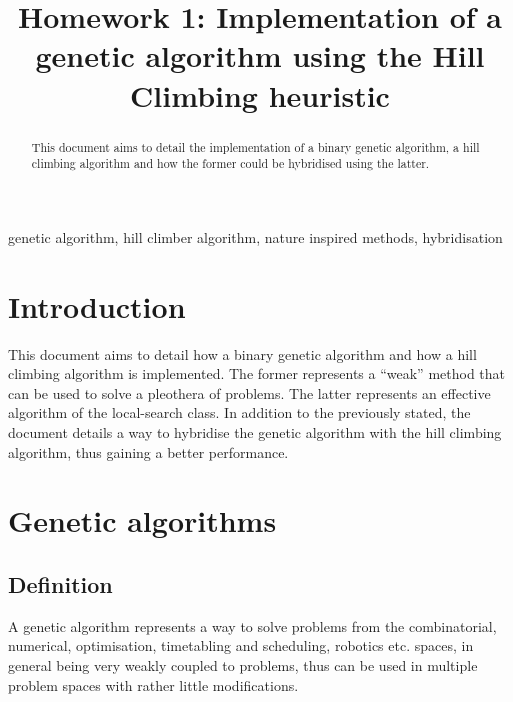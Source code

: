 \documentclass[conference]{IEEEtran}
\begin{document}
\title{Homework 1: Implementation of a genetic algorithm using the Hill Climbing heuristic}

\author{
}

\maketitle


\begin{abstract}
This document aims to detail the implementation of a binary genetic algorithm, a hill climbing algorithm
and how the former could be hybridised using the latter.
\end{abstract}

\begin{IEEEkeywords}
genetic algorithm, hill climber algorithm, nature inspired methods, hybridisation
\end{IEEEkeywords}

\section{Introduction}
This document aims to detail how a binary genetic algorithm and how a hill climbing algorithm is implemented.
The former represents a ``weak'' method that can be used to solve a pleothera of problems. The latter represents
an effective algorithm of the local-search class. In addition to the previously stated, the document details a
way to hybridise the genetic algorithm with the hill climbing algorithm, thus gaining a better performance.

\section{Genetic algorithms}

\subsection{Definition}
A genetic algorithm represents a way to solve problems from the combinatorial, numerical, optimisation, timetabling and
scheduling, robotics etc. spaces, in general being very weakly coupled to problems, thus can be used in multiple
problem spaces with rather little modifications.
\end{document}
